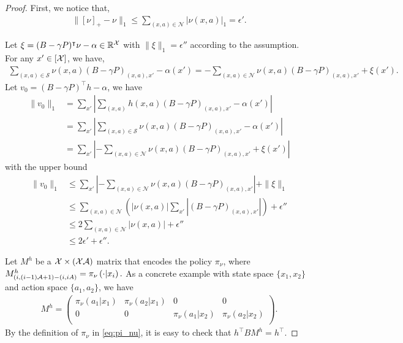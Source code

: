\documentclass[11pt]{article}
\newcounter{assumption}%
\begin{document}
\begin{proof}
  First, we notice that,
  \begin{eqnarray}
    \|\left[\nu\right]_+-\nu\|_1 \leq \sum_{(x,a) \in \mathcal{N}} |\nu(x,a)|_1 = \epsilon'.
    \label{eq:h_mu_diff}
  \end{eqnarray}

  Let $\xi = (B-\gamma P)^\intercal \nu -\alpha \in \mathbb{R}^{\cal X}$ with $\|\xi\|_1 = \epsilon''$ according to the assumption. For any $x' \in [{\cal X}]$, we have,
  \begin{eqnarray*}
    \sum_{(x,a) \in \mathcal{S}} \nu(x,a) (B-\gamma P)_{(x,a), x'} -\alpha(x') =- \sum_{(x,a) \in \mathcal{N}} \nu(x,a) (B-\gamma P)_{(x,a), x'}  + \xi(x').
  \end{eqnarray*}
  Let $v_0=(B-\gamma P)^\top h - \alpha$, we have
  \begin{align}
    \|v_0\|_1 & = \sum_{x'} \left| \sum_{(x,a)} h(x,a) (B-\gamma P)_{(x,a), x'} -\alpha(x')  \right| \nonumber \\
       & = \sum_{x'} \left| \sum_{(x,a) \in \mathcal{S}} \nu(x,a) (B-\gamma P)_{(x,a), x'} -\alpha(x')  \right| \nonumber \\
       & = \sum_{x'} \left| - \sum_{(x,a) \in \mathcal{N}} \nu(x,a) (B-\gamma P)_{(x,a), x'} + \xi(x')  \right|
  \end{align}
  with the upper bound
\begin{align}
\|v_0\|_1 & \leq
 \sum_{x'} \left| - \sum_{(x,a) \in \mathcal{N}} \nu(x,a) (B-\gamma P)_{(x,a), x'} \right| + \|\xi\|_1 \nonumber \\
       & \leq \sum_{(x,a) \in \mathcal{N}}\left( |\nu(x,a)|  \sum_{x'} \left| (B-\gamma P)_{(x,a), x'} \right| \right) + \epsilon'' \nonumber \\
       & \leq 2 \sum_{(x,a) \in \mathcal{N}} |\nu(x,a)| + \epsilon'' \nonumber \\
       & \leq 2 \epsilon' + \epsilon''.
       \label{eq:v_0}
  \end{align}

   Let $M^h$ be a ${\cal X} \times ({\cal X}{\cal A})$ matrix that encodes the policy $\pi_\nu$, where $
   M^h_{(i, (i-1){\cal A}+1)- (i, iA)} = \pi_\nu \left(\cdot | x_i \right).$
  As a concrete example with state space $\{x_1, x_2\}$ and action space $\{a_1, a_2\}$, we have
  \begin{eqnarray*}
    M^h= \begin{pmatrix}
      \pi_\nu(a_1 |x_1) & \pi_\nu(a_2 | x_1) & 0 & 0 \\
       0 & 0 & \pi_\nu(a_1 |x_2) & \pi_\nu(a_2 | x_2) \\
    \end{pmatrix}.
  \end{eqnarray*}
  By the definition of $\pi_\nu$ in \eqref{eq:pi_nu}, it is easy to check that $h^\top B M^h= h^\top$.


\end{proof}
\end{document}
